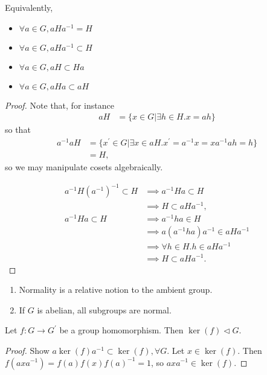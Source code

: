 \documentclass{article}
\begin{document}
Equivalently,
\begin{itemize}
  \item{$\forall a \in G, a H a^{-1} = H$}
  \item{$\forall a \in G, a H a^{-1} \subset H$}
  \item{$\forall a \in G, a H \subset Ha$}
  \item{$\forall a \in G, a H a \subset a H$}
\end{itemize}
\begin{proof}
Note that, for instance
\begin{align*}
a H & = \{ x \in G | \exists h \in H . x = a h \}
\end{align*}
so that
\begin{align*}
a^{-1} a H & = \{ x^\prime \in G | \exists x \in a H . x^\prime =
a^{-1} x = x a^{-1} a h = h \} \\
          & = H,
\end{align*}
so we may manipulate cosets algebraically.

\begin{align*}
           a^{-1} H (a^{-1})^{-1} \subset H 
& \implies a^{-1} H a \subset H  \\
& \implies H \subset a H a^{-1}, \\
           a^{-1} H a \subset H
& \implies a^{-1} h a \in H \\
& \implies a (a^{-1} h a) a^{-1} \in a H a^{-1} \\
& \implies \forall h \in H . h \in a H a^{-1} \\
& \implies H \subset a H a^{-1}.
\end{align*}
\end{proof}

\begin{remark}
\begin{enumerate}
  \item{Normality is a relative notion to the ambient group.}
  \item{If $G$ is abelian, all subgroups are normal.}
\end{enumerate}
\end{remark}

\begin{prop}
Let $f : G \to G^\prime$ be a group homomorphism. Then 
$\ker(f) \triangleleft G$.
\end{prop}
\begin{proof}
Show $a \ker(f) a^{-1} \subset \ker(f), \forall G$.
Let $x \in \ker(f).$ Then 
$f(a x a^{-1}) = f(a) f(x) f(a)^{-1} = 1$, so
$a x a^{-1} \in \ker(f)$.
\end{proof}
\end{document}
